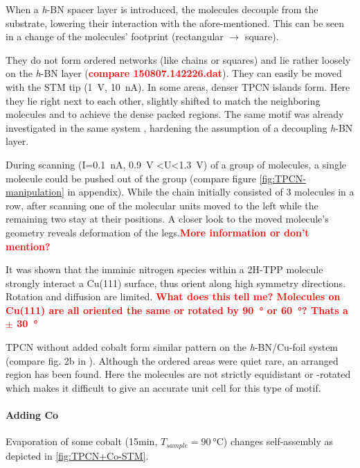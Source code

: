   When a \textit{h}-BN spacer layer is introduced, the molecules decouple from the substrate, lowering their interaction with the afore-mentioned. This can be seen in a change of the molecules' footprint (rectangular $\rightarrow$ square).
  
  They do not form ordered networks (like chains or squares) and lie rather loosely on the \textit{h}-BN layer (\textcolor{red}{\textbf{compare 150807.142226.dat}}). They can easily be moved with the STM tip (\SI{1}{\volt}, \SI{10}{\nano \ampere}). In some areas, denser TPCN islands form. Here they lie right next to each other, slightly shifted to match the neighboring molecules and to achieve the dense packed regions. The same motif was already investigated in the same system \cite{urgel_controlling_2015}, hardening the assumption of a decoupling \textit{h}-BN layer.
  
  During scanning (I=\SI{0.1}{\nA}, \SI{0.9}{\V} <U<\SI{1.3}{\V}) of a group of molecules, a single molecule could be pushed out of the group (compare figure \autoref{fig:TPCN-manipulation} in appendix). While the chain initially consisted of 3 molecules in a row, after scanning one of the molecular units moved to the left while the remaining two stay at their positions. A closer look to the moved molecule's geometry reveals deformation of the legs.\textcolor{red}{\textbf{More information or don't mention?}}
  
  It was shown that the imminic nitrogen species within a 2H-TPP molecule strongly interact a Cu(111) surface, thus orient along high symmetry directions.\cite{haq_clean_2011, buchner_diffusion_2011, gonzalez-moreno_following_2011, diller_self-metalation_2012, ditze_activation_2012,rojas_self-assembly_2010} 
  Rotation and diffusion are limited. \textcolor{red}{\textbf{What does this tell me? Molecules on Cu(111) are all oriented the same or rotated by \SI{90}{\degree} or \SI{60}{\degree}? Thats a $\pm$ \SI{30}{\degree}}}
 
 TPCN without added cobalt form similar pattern on the \textit{h}-BN/Cu-foil system (compare fig. 2b in \cite{urgel_controlling_2015}). Although the ordered areas were quiet rare, an arranged region has been found. Here the molecules are not strictly equidistant or -rotated which makes it difficult to give an accurate unit cell for this type of motif.
  
  \paragraph{Adding Co}
  Evaporation of some cobalt (15min, $T_{sample}=\SI{90}{\celsius}$) changes self-assembly as depicted in \autoref{fig:TPCN+Co-STM}. 
  
